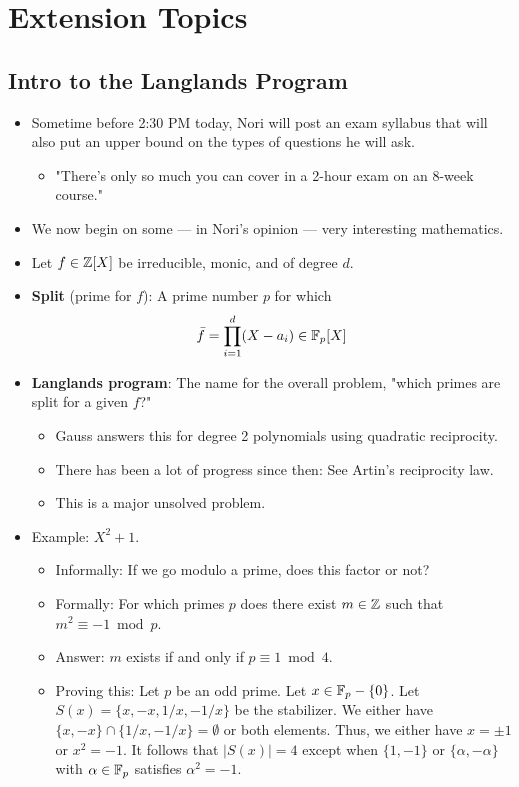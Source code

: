 \documentclass[../notes.tex]{subfiles}
\begin{document}
\chapter{Extension Topics}
\section{Intro to the Langlands Program}
\begin{itemize}
    \item {}Sometime before 2:30 PM today, Nori will post an exam syllabus that will also put an upper bound on the types of questions he will ask.
    \begin{itemize}
        \item "There's only so much you can cover in a 2-hour exam on an 8-week course."
    \end{itemize}
    \item We now begin on some --- in Nori's opinion --- very interesting mathematics.
    \item Let $f\in\mathbb{Z}[X]$ be irreducible, monic, and of degree $d$.
    \item \textbf{Split} (prime for $f$): A prime number $p$ for which
    \begin{equation*}
        \bar{f} = \prod_{i=1}^d(X-a_i) \in \mathbb{F}_p[X]
    \end{equation*}
    \item \textbf{Langlands program}: The name for the overall problem, "which primes are split for a given $f$?"
    \begin{itemize}
        \item Gauss answers this for degree 2 polynomials using quadratic reciprocity.
        \item There has been a lot of progress since then: See Artin's reciprocity law.
        \item This is a major unsolved problem.
    \end{itemize}
    \item Example: $X^2+1$.
    \begin{itemize}
        \item Informally: If we go modulo a prime, does this factor or not?
        \item Formally: For which primes $p$ does there exist $m\in\mathbb{Z}$ such that $m^2\equiv -1\bmod p$.
        \item Answer: $m$ exists if and only if $p\equiv 1\bmod 4$.
        \item Proving this: Let $p$ be an odd prime. Let $x\in\mathbb{F}_p-\{0\}$. Let $S(x)=\{x,-x,1/x,-1/x\}$ be the stabilizer. We either have $\{x,-x\}\cap\{1/x,-1/x\}=\emptyset$ or both elements. Thus, we either have $x=\pm 1$ or $x^2=-1$. It follows that $|S(x)|=4$ except when $\{1,-1\}$ or $\{\alpha,-\alpha\}$ with $\alpha\in\mathbb{F}_p$ satisfies $\alpha^2=-1$.

\end{itemize}
\end{itemize}
\end{document}

